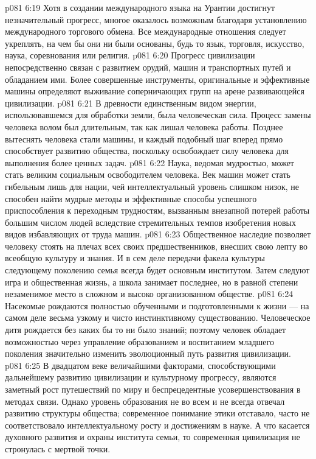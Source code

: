 \vs p081 6:19 Хотя в создании международного языка на Урантии достигнут незначительный прогресс, многое оказалось возможным благодаря установлению международного торгового обмена. Все международные отношения следует укреплять, на чем бы они ни были основаны, будь то язык, торговля, искусство, наука, соревнования или религия.
\vs p081 6:20 \bibnobreakspace {} Прогресс цивилизации непосредственно связан с развитием орудий, машин и транспортных путей и обладанием ими. Более совершенные инструменты, оригинальные и эффективные машины определяют выживание соперничающих групп на арене развивающейся цивилизации.
\vs p081 6:21 В древности единственным видом энергии, использовавшемся для обработки земли, была человеческая сила. Процесс замены человека волом был длительным, так как лишал человека работы. Позднее вытеснять человека стали машины, и каждый подобный шаг вперед прямо способствует развитию общества, поскольку освобождает силу человека для выполнения более ценных задач.
\vs p081 6:22 Наука, ведомая мудростью, может стать великим социальным освободителем человека. Век машин может стать гибельным лишь для нации, чей интеллектуальный уровень слишком низок, не способен найти мудрые методы и эффективные способы успешного приспособления к переходным трудностям, вызванным внезапной потерей работы большим числом людей вследствие стремительных темпов изобретения новых видов избавляющих от труда машин.
\vs p081 6:23 \bibnobreakspace {} Общественное наследие позволяет человеку стоять на плечах всех своих предшественников, внесших свою лепту во всеобщую культуру и знания. И в сем деле передачи факела культуры следующему поколению семья всегда будет основным институтом. Затем следуют игра и общественная жизнь, а школа занимает последнее, но в равной степени незаменимое место в сложном и высоко организованном обществе.
\vs p081 6:24 Насекомые рождаются полностью обученными и подготовленными к жизни --- на самом деле весьма узкому и чисто инстинктивному существованию. Человеческое дитя рождается без каких бы то ни было знаний; поэтому человек обладает возможностью через управление образованием и воспитанием младшего поколения значительно изменить эволюционный путь развития цивилизации.
\vs p081 6:25 В двадцатом веке величайшими факторами, способствующими дальнейшему развитию цивилизации и культурному прогрессу, являются заметный рост путешествий по миру и беспрецедентные усовершенствования в методах связи. Однако уровень образования не во всем и не всегда отвечал развитию структуры общества; современное понимание этики отставало, часто не соответствовало интеллектуальному росту и достижениям в науке. А что касается духовного развития и охраны института семьи, то современная цивилизация не стронулась с мертвой точки.
